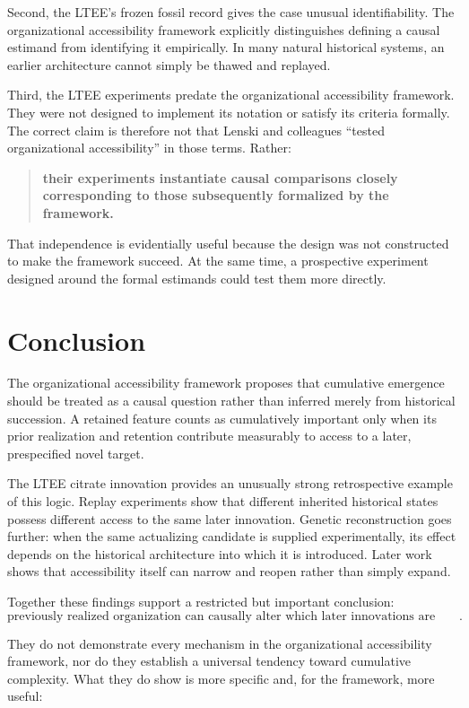\documentclass[11pt]{article}
\begin{document}
Second, the LTEE's frozen fossil record gives the case unusual identifiability. The organizational accessibility framework explicitly distinguishes defining a causal estimand from identifying it empirically. In many natural historical systems, an earlier architecture cannot simply be thawed and replayed.

Third, the LTEE experiments predate the organizational accessibility framework. They were not designed to implement its notation or satisfy its criteria formally. The correct claim is therefore not that Lenski and colleagues ``tested organizational accessibility'' in those terms. Rather:

\begin{quote}
\textbf{their experiments instantiate causal comparisons closely corresponding to those subsequently formalized by the framework.}
\end{quote}

That independence is evidentially useful because the design was not constructed to make the framework succeed. At the same time, a prospective experiment designed around the formal estimands could test them more directly.

\section{Conclusion}

The organizational accessibility framework proposes that cumulative emergence should be treated as a causal question rather than inferred merely from historical succession. A retained feature counts as cumulatively important only when its prior realization and retention contribute measurably to access to a later, prespecified novel target.

The LTEE citrate innovation provides an unusually strong retrospective example of this logic. Replay experiments show that different inherited historical states possess different access to the same later innovation. Genetic reconstruction goes further: when the same actualizing candidate is supplied experimentally, its effect depends on the historical architecture into which it is introduced. Later work shows that accessibility itself can narrow and reopen rather than simply expand.

Together these findings support a restricted but important conclusion:
\[
\boxed{\text{previously realized organization can causally alter which later innovations are accessible}.}
\]

They do not demonstrate every mechanism in the organizational accessibility framework, nor do they establish a universal tendency toward cumulative complexity. What they do show is more specific and, for the framework, more useful:
\end{document}
